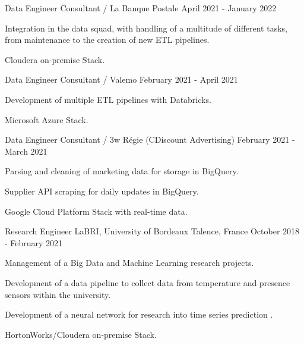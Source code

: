 \begin{cventries}
	\cventry
	{Data Engineer Consultant / La Banque Postale}{}{}
	{April 2021 - January 2022}
	{
		\begin{cvitems}
			\item Integration in the data squad, with handling of a multitude of different tasks, from maintenance to the creation of new ETL pipelines.
			\item Cloudera on-premise Stack.
		\end{cvitems}
	}
	
	\cventry
	{Data Engineer Consultant / Valemo}{}{}
	{February 2021 - April 2021}
	{
		\begin{cvitems}
			\item Development of multiple ETL pipelines with Databricks.
			\item Microsoft Azure Stack.
		\end{cvitems}
	}
	
	\cventry
	{Data Engineer Consultant / 3w Régie (CDiscount Advertising)}{}{}
	{February 2021 - March 2021}
	{
		\begin{cvitems}
			\item Parsing and cleaning of marketing data for storage in BigQuery.
			\item Supplier API scraping for daily updates in BigQuery.
			\item Google Cloud Platform Stack with real-time data.
		\end{cvitems}
	}
	
	\cventry
	{Research Engineer}
	{LaBRI, University of Bordeaux}
	{Talence, France}
	{October 2018 - February 2021}
	{
		\begin{cvitems}
			\item Management of a Big Data and Machine Learning research projects.
			\item Development of a data pipeline to collect data from temperature and presence sensors within the university.
			\item Development of a neural network for research into time series prediction .
			\item HortonWorks/Cloudera on-premise Stack.
		\end{cvitems}
	}
	
\end{cventries}